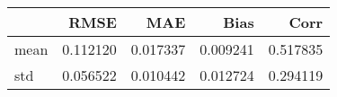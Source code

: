 \begin{tabular}{lrrrr}
\toprule
{} &      RMSE &       MAE &      Bias &      Corr \\
\midrule
mean &  0.112120 &  0.017337 &  0.009241 &  0.517835 \\
std  &  0.056522 &  0.010442 &  0.012724 &  0.294119 \\
\bottomrule
\end{tabular}
